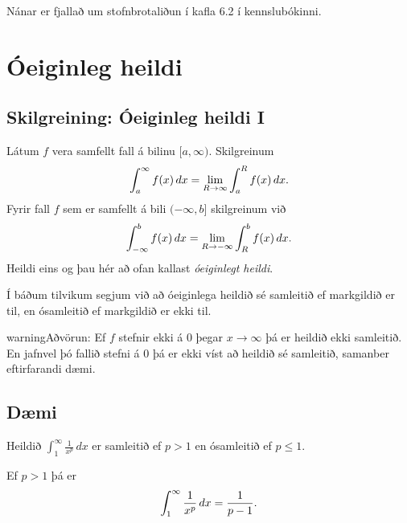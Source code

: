 \documentclass[b5paper,10pt,icelandic]{sphinxmanual}
\begin{document}
Nánar er fjallað um stofnbrotaliðun í kafla 6.2 í kennslubókinni.


\section{Óeiginleg heildi}
\label{kafli06:index-14}\label{kafli06:oeiginleg-heildi}

\subsection{Skilgreining: Óeiginleg heildi I}
\label{kafli06:skilgreining-oeiginleg-heildi-i}
Látum \(f\) vera samfellt fall á bilinu \([a, \infty)\).
Skilgreinum
\begin{gather}
\begin{split}\int_a^\infty f(x)\,dx=\lim_{R\rightarrow\infty} \int_a^R f(x)\,dx.\end{split}\notag
\end{gather}
Fyrir fall \(f\) sem er samfellt á bili \((-\infty, b]\)
skilgreinum við
\begin{gather}
\begin{split}\int_{-\infty}^b f(x)\,dx=\lim_{R\rightarrow-\infty} \int_R^b f(x)\,dx.\end{split}\notag
\end{gather}
Heildi eins og þau hér að ofan kallast \textit{óeiginlegt heildi}.

Í báðum tilvikum segjum við að óeiginlega heildið sé samleitið ef
markgildið er til, en ósamleitið ef markgildið er ekki til.

\begin{notice}{warning}{Aðvörun:}
Ef \(f\) stefnir ekki á 0 þegar \(x\to \infty\) þá
er heildið ekki samleitið. En jafnvel þó fallið stefni á
0 þá er ekki víst að heildið sé samleitið, samanber
eftirfarandi dæmi.
\end{notice}


\subsection{Dæmi}
\label{kafli06:daemi}
Heildið \(\int_1^\infty \frac{1}{x^p}\,dx\) er samleitið ef
\(p>1\) en ósamleitið ef \(p\leq 1\).

Ef \(p>1\) þá er
\begin{gather}
\begin{split}\int_1^\infty \frac{1}{x^p}\,dx=\frac{1}{p-1}.\end{split}\notag
\end{gather}
\end{document}
